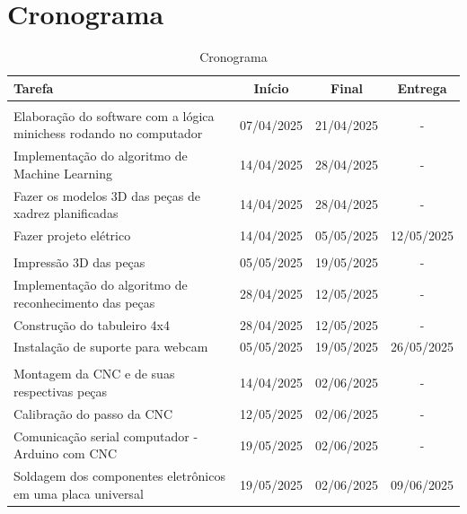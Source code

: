 \documentclass[a4paper,12pt]{article}
\begin{document}
\section{Cronograma}  

\begin{table}[htbp]
\centering
\caption{Cronograma}
\label{tab:cronograma}
\renewcommand{\arraystretch}{1.5}
\begin{tabularx}{\textwidth}{Yccc}
\toprule
{}
\textbf{Tarefa} & \textbf{Início} & \textbf{Final} & \textbf{Entrega} \\
\midrule

 \\
Elaboração do software com a lógica minichess rodando no computador & 07/04/2025 & 21/04/2025 & - \\
Implementação do algoritmo de Machine Learning & 14/04/2025 & 28/04/2025 & - \\
Fazer os modelos 3D das peças de xadrez planificadas & 14/04/2025 & 28/04/2025 & - \\
Fazer projeto elétrico & 14/04/2025 & 05/05/2025 & 12/05/2025 \\

 \\
Impressão 3D das peças & 05/05/2025 & 19/05/2025 & - \\
Implementação do algoritmo de reconhecimento das peças & 28/04/2025 & 12/05/2025 & - \\
Construção do tabuleiro 4x4 & 28/04/2025 & 12/05/2025 & - \\
Instalação de suporte para webcam & 05/05/2025 & 19/05/2025 & 26/05/2025 \\

 \\
Montagem da CNC e de suas respectivas peças & 14/04/2025 & 02/06/2025 & - \\
Calibração do passo da CNC & 12/05/2025 & 02/06/2025 & - \\
Comunicação serial computador - Arduino com CNC & 19/05/2025 & 02/06/2025 & - \\
Soldagem dos componentes eletrônicos em uma placa universal & 19/05/2025 & 02/06/2025 & 09/06/2025 \\

\bottomrule
\end{tabularx}

\end{table}
\end{document}
